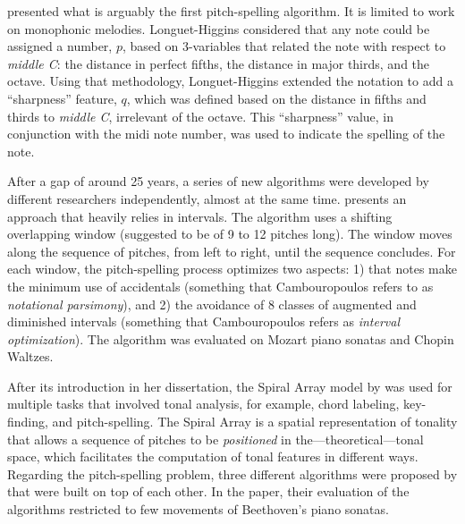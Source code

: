 

\textcite{longuethiggins1976perception} presented what is
arguably the first pitch-spelling algorithm. It is limited
to work on monophonic melodies. Longuet-Higgins considered
that any note could be assigned a number, $p$, based on
3-variables that related the note with respect to
\emph{middle C}: the distance in perfect fifths, the
distance in major thirds, and the octave. Using that
methodology, Longuet-Higgins extended the notation to add a
``sharpness'' feature, $q$, which was defined based on the
distance in fifths and thirds to \emph{middle C}, irrelevant
of the octave. This ``sharpness'' value, in conjunction with
the \gls{midi} note number, was used to indicate the spelling of
the note.

After a gap of around 25 years, a series of new algorithms
were developed by different researchers independently,
almost at the same time. \textcite{cambouropoulos2003pitch}
presents an approach that heavily relies in intervals. The
algorithm uses a shifting overlapping window (suggested to
be of 9 to 12 pitches long). The window moves along the
sequence of pitches, from left to right, until the sequence
concludes. For each window, the pitch-spelling process
optimizes two aspects: 1) that notes make the minimum use of
accidentals (something that Cambouropoulos refers to as
\emph{notational parsimony}), and 2) the avoidance of 8
classes of augmented and diminished intervals (something
that Cambouropoulos refers as \emph{interval optimization}).
The algorithm was evaluated on Mozart piano sonatas and
Chopin Waltzes.

After its introduction in her dissertation, the Spiral Array
model by \textcite{chew2000towards} was used for multiple
tasks that involved tonal analysis, for example, chord
labeling, key-finding, and pitch-spelling. The Spiral Array
is a spatial representation of tonality that allows a
sequence of pitches to be \emph{positioned} in
the---theoretical---tonal space, which facilitates the
computation of tonal features in different ways. Regarding
the pitch-spelling problem, three different algorithms were
proposed by \textcite{chew2003determining} that were built
on top of each other. In the paper, their evaluation of the
algorithms restricted to few movements of Beethoven's piano
sonatas.

